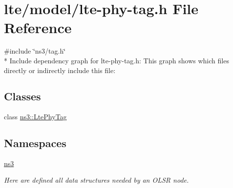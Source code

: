 \hypertarget{lte-phy-tag_8h}{}\section{lte/model/lte-\/phy-\/tag.h File Reference}
\label{lte-phy-tag_8h}
{\ttfamily \#include \char`\"{}ns3/tag.\+h\char`\"{}}\\*
Include dependency graph for lte-\/phy-\/tag.h\+:
This graph shows which files directly or indirectly include this file\+:
\subsection*{Classes}
\begin{DoxyCompactItemize}
\item 
class \hyperlink{classns3_1_1LtePhyTag}{ns3\+::\+Lte\+Phy\+Tag}
\end{DoxyCompactItemize}
\subsection*{Namespaces}
\begin{DoxyCompactItemize}
\item 
 \hyperlink{namespacens3}{ns3}
\begin{DoxyCompactList}\small\item\em Here are defined all data structures needed by an O\+L\+SR node. \end{DoxyCompactList}\end{DoxyCompactItemize}
